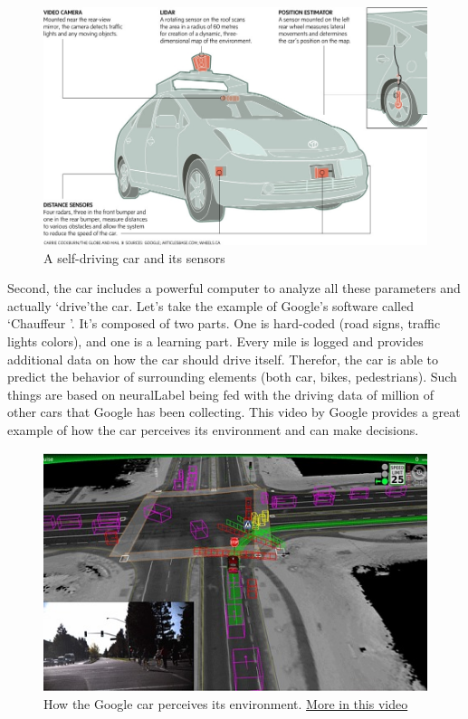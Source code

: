 \documentclass[12pt]{article}
\begin{document}
\smallskip

\begin{figure}[ht]
    \centering
    \includegraphics[width=\linewidth]{car-diagram}
    \caption{A self-driving car and its sensors}
    \label{fig:car}
\end{figure}

\smallskip

Second, the car includes a powerful computer to analyze all these parameters
and actually \lq drive\rq the car. Let's take the example of Google's software
called \lq Chauffeur \rq . It's composed of two parts. One is hard-coded
(road signs, traffic lights colors), and one is a learning part. Every mile is
logged and provides additional data on how the car should drive itself.
Therefor, the car is able to predict the behavior of surrounding elements
(both car, bikes, pedestrians). Such things are based on \gls{neuralLabel} being
fed with the driving data of million of other cars
that Google has been collecting. This video by Google provides a great example
of how the car perceives its environment and can make decisions.

\smallskip

\begin{figure}[ht]
    \centering
    \includegraphics[width=\linewidth]{google-car}
    \caption{How the Google car perceives its environment.
    \href{https://www.youtube.com/watch?v=dk3oc1Hr62g}{More in this video}}
    \label{fig:google_car}
\end{figure}
\end{document}
